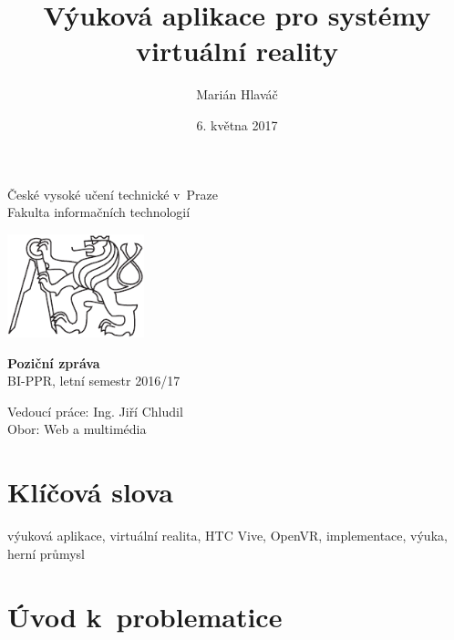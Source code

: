 \documentclass[12pt, a4paper]{article}
\title{Výuková aplikace pro systémy virtuální reality}
\author{Marián Hlaváč}
\date{6. května 2017}
\begin{document}
    \begin{titlepage}

        \begin{center}
        České vysoké učení technické v~Praze\\
        Fakulta informačních technologií
        \end{center}

        \vspace{1cm}

        \begin{center}
        \includegraphics[height=3cm]{cvut-logo-bw}
        \end{center}

        \vspace{3cm}
        {\let\newpage\relax\maketitle}
        \thispagestyle{empty}

        \begin{center}
        \textbf{Poziční zpráva}\\
        BI-PPR, letní semestr 2016/17\\
        \end{center}

        \begin{center}
        Vedoucí práce: Ing. Jiří Chludil\\
        Obor: Web a multimédia\\
        \end{center}
    \end{titlepage}

\section{Klíčová slova}

výuková aplikace, virtuální realita, HTC Vive, OpenVR, implementace, výuka, herní průmysl

\section{Úvod k~problematice}
\end{document}
